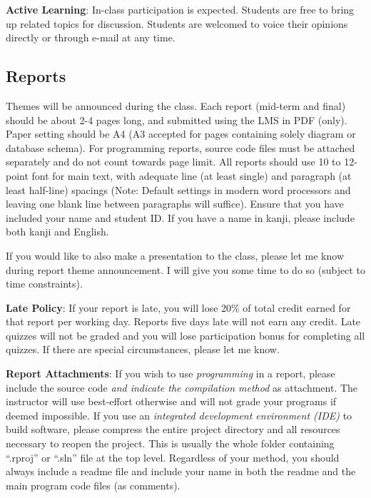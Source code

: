 \documentclass[a4paper]{article}
\begin{document}
\smallskip\noindent
\textbf{Active Learning}: In-class participation is expected. Students are free to bring up related topics for discussion. Students are welcomed to voice their opinions directly or through e-mail at any time.

\subsection{Reports}

Themes will be announced during the class. Each report (mid-term and final) should be about 2-4 pages long, and submitted using the LMS in PDF (only). Paper setting should be A4 (A3 accepted for pages containing solely diagram or database schema). For programming reports, source code files must be attached separately and do not count towards page limit. All reports should use 10 to 12-point font for main text, with adequate line (at least single) and paragraph (at least half-line) spacings (Note: Default settings in modern word processors and leaving one blank line between paragraphs will suffice). Ensure that you have included your name and student ID. If you have a name in kanji, please include both kanji and English.

If you would like to also make a presentation to the class, please let me know during report theme announcement. I will give you some time to do so (subject to time constraints).

\smallskip\noindent
\textbf{Late Policy}: If your report is late, you will lose 20\% of total credit earned for that report per working day. Reports five days late will not earn any credit. Late quizzes will not be graded and you will lose participation bonus for completing all quizzes. If there are special circumstances, please let me know.

\smallskip\noindent
\textbf{Report Attachments}:
If you wish to use \textit{programming} in a report, please include the source code \textit{and indicate the compilation method} as attachment. The instructor will use best-effort otherwise and will not grade your programs if deemed impossible.
If you use an \textit{integrated development environment (IDE)} to build software, please compress the entire project directory and all resources necessary to reopen the project. This is usually the whole folder containing ``.rproj'' or ``.sln'' file at
the top level. Regardless of your method, you should always include a readme file and include your name in both the readme and the main program code files (as comments).
\end{document}
